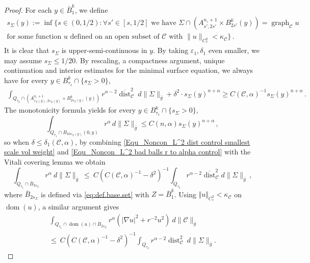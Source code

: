 \documentclass[11pt, letterpaper, reqno]{amsart}
\numberwithin{equation}{section}
\theoremstyle{remark}
\newcommand{\cC}{\mathcal{C}}
\newcommand{\graph}{\operatorname{graph}}
\newcommand{\dist}{\operatorname{dist}}
\newcommand{\Sdist}{\overline{\dist}}
\DeclareMathOperator{\Dom}{dom}
\newcommand{\eps}{\varepsilon}
\begin{document}
   \begin{proof}
     For each $y\in \bar{B}^k_1$, we define 
     \begin{multline*}
       s_\Sigma(y):= \inf\big\{s\in (0, 1/2): \forall s'\in [s,1/2] \textrm{ we have } \Sigma \cap (A^{n_\circ+1}_{s', {2s'}}\times B_{2s'}^k(y)) = \graph_\cC u\\
       \text{for some function $u$ defined on an open subset of }\cC \text{ with } \|u\|_{C^2_*} < \kappa_\cC  \big\} \,. 
     \end{multline*}
     It is clear that $s_\Sigma$ is upper-semi-continuous in $y$. By taking $\eps_1,\delta_1$ even smaller, we may assume $s_\Sigma\leq 1/20$. By rescaling, a compactness argument, unique continuation and interior estimates for the minimal surface equation, we always have for every $y\in {B}_{\tau_1}^k \cap \{s_\Sigma >0\}$, 
 \begin{align}
       \int_{Q_{\tau_2} \cap (A^{n_\circ+1}_{s_\Sigma(y), 2s_\Sigma(y)}\times B^k_{2s_\Sigma(y)}(y))} r^{\alpha-2} \Sdist_\cC^2 \ d\|\Sigma\|_{\bar g} + \delta^2 \cdot s_\Sigma(y)^{n+\alpha} \geq C(\cC,\alpha)^{-1}s_\Sigma(y)^{n+\alpha} \,. \label{Equ_Noncon_L^2 dist control smallest scale vol weight}
\end{align}
The monotonicity formula yields for every $y\in {B}_{\tau_1}^k \cap \{s_\Sigma >0\}$,
\begin{equation}
  \int_{Q_{\tau_1} \cap B_{10s_\Sigma(y)}(0,y)} r^\alpha \, d\|\Sigma\|_{\bar g} \leq C(n, \alpha)s_\Sigma(y)^{n+\alpha}\,,\label{Equ_Noncon_L^2 bad balls r to alpha control}
\end{equation}
so when $\delta\leq \delta_1(\cC,\alpha)$, by combining \eqref{Equ_Noncon_L^2 dist control smallest scale vol weight} and \eqref{Equ_Noncon_L^2 bad balls r to alpha control} with the Vitali covering lemma we obtain
\[
  \int_{Q_{\tau_1} \cap\bar{B}_{2s_\Sigma}}r^\alpha\ d\|\Sigma\|_{\bar g} 
       \ \leq\ C(C(\cC,\alpha)^{-1}-\delta^2)^{-1} \int_{Q_{\tau_2}} r^{\alpha-2}\Sdist_\cC^2 d\|\Sigma\|_{\bar g}\, ,
\]
 where $\bar B_{2s_\Sigma}$ is defined via \eqref{eq:def.base.set} with $Z=\bar B^k_1$. Using $\Vert u \Vert_{C^2_*} < \kappa_\cC$ on $\Dom(u)$, a similar argument gives
\begin{multline}\label{eq noncon W12 estimates near bad}
\int_{Q_{\tau_1} \cap \Dom(u) \cap \overline B_{2s_\Sigma}} r^\alpha (|\nabla u|^2 + r^{-2} u^2) \ d\|\cC\|_{\bar g} \\
\leq\ C(C(\cC,\alpha)^{-1}-\delta^2)^{-1}  \int_{Q_{\tau_2}} r^{\alpha-2}\dist_\cC^2 \ d\|\Sigma\|_{\bar g} . 

\end{multline}
\end{proof}
\end{document}
